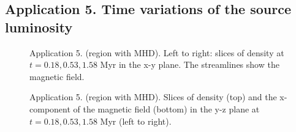 \documentclass[useAMS,usenatbib]{mn2e}
\begin{document}

\subsection{Application 5. Time variations of the source luminosity}

\begin{figure*}
  \caption{\label{fig:test14_1} Application 5. (\hii region with MHD).
    Left to right: slices of density at $t = 0.18, 0.53, 1.58$ Myr in
    the x-y plane.  The streamlines show the magnetic field.}
\end{figure*}

\begin{figure*}
  \caption{\label{fig:test14_2} Application 5. (\hii region with
    MHD). Slices of density (top) and the x-component of the magnetic
    field (bottom) in the y-z plane at $t = 0.18, 0.53, 1.58$ Myr
    (left to right).}
\end{figure*}
\end{document}
